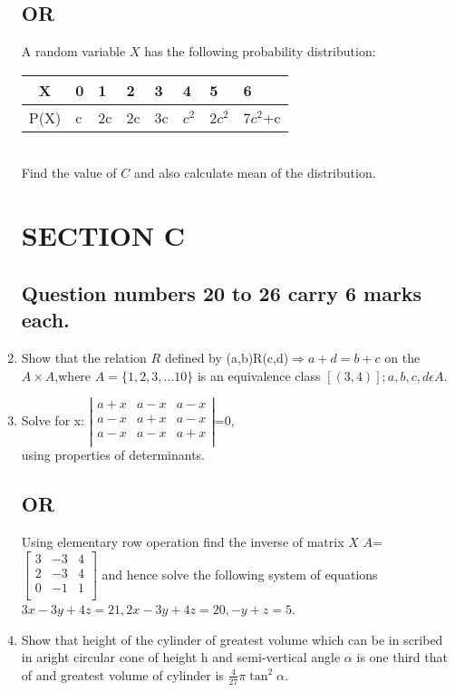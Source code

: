 \documentclass{article}
\begin{document}
\begin{enumerate}
		\subsection*{\centering OR}
		A random variable $X$ has the following probability distribution:\\
\begin{table}[htb]
\centering
\begin{tabularx}{\textwidth}{|c|X|X|X|X|X|X|X|}
\hline
X & 0 & 1 & 2 & 3 & 4 & 5 & 6 \\
\hline
P(X) & c & 2c & 2c & 3c & $c^2$ & $2c^2$ & $7c^2$+c \\
\hline
\end{tabularx}
\end{table}\\		
			Find the value of $C$ and also calculate mean of the distribution.
		\section*{\centering SECTION C}
		\subsection*{\centering Question numbers 20 to 26 carry 6 marks each.}
	\item Show that the relation $R$ defined by (a,b)R(c,d)$\Rightarrow a+d=b+c$ on the $A\times A$,where $A=\{1,2,3,...10\}$ is an equivalence class $[(3,4)];a,b,c,d \epsilon A$.
		\item Solve for x: $\left|
		\begin{matrix}
                 a+x&a-x&a-x\\
	         a-x&a+x&a-x\\
		 a-x&a-x&a+x\\
		 \end{matrix} \right|$=$0$,\\
		 using properties of determinants.
		 \subsection*{\centering OR}
		 Using elementary row operation find the inverse of matrix $X$ $A$=$\left[ 
		 \begin{matrix}
			 3&-3&4\\
			 2&-3&4\\
			 0&-1&1\\
		 \end{matrix}
		 \right]$ and hence solve the following system of equations $3x-3y+4z=21,2x-3y+4z=20,-y+z=5$.
	 \item Show that height of the cylinder of greatest volume which can be in scribed in aright circular cone of height h and semi-vertical angle $\alpha$ is one third that of and greatest volume of cylinder is $\frac{4}{27}\pi \tan^2 \alpha$.

\end{enumerate}
\end{document}
